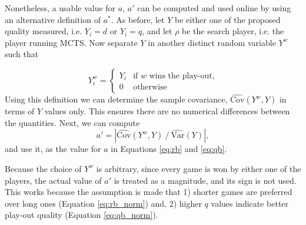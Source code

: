 \documentclass{ecai2014}
\newcommand{\SVar}[1]{\mathrm{\widehat{Var}}\left( #1 \right)}
\newcommand{\SCov}[1]{\mathrm{\widehat{Cov}}\left( #1 \right)}
\begin{document}

Nonetheless, a usable value for $a$, $a'$ can be computed and used online by using an alternative definition of $a^*$. As before, let $Y$ be either one of the proposed quality measured, i.e. $Y_i=d$ or $Y_i=q$, and let $\rho$ be the search player, i.e. the player running MCTS. Now separate $Y$ in another distinct random variable $Y^w$ such that

\begin{equation}
Y^w_i =
\begin{cases}
   Y_i & \text{if $w$ wins the play-out,} \\
   0   & \text{otherwise}
\end{cases}
\label{eq:ywin}
\end{equation}
Using this definition we can determine the sample covariance, $\SCov{Y^w,Y}$ in terms of $Y$ values only. This ensures there are no numerical differences between the quantities. Next, we can compute 
\begin{equation}
	a'=\left|{\SCov{Y^w,Y}}\mathbin{/}{\SVar{Y}}\right|,
\label{eq:onlinea}
\end{equation}
\noindent and use it, as the value for $a$ in Equations \ref{eq:rb} and \ref{eq:qb}. 

Because the choice of $Y^w$ is arbitrary, since every game is won by either one of the players, the actual value of $a'$ is treated as a magnitude, and its sign is not used. This works because the assumption is made that 1) shorter games are preferred over long ones (Equation \ref{eq:rb_norm}) and, 2) higher $q$ values indicate better play-out quality (Equation \ref{eq:qb_norm}).
\end{document}
